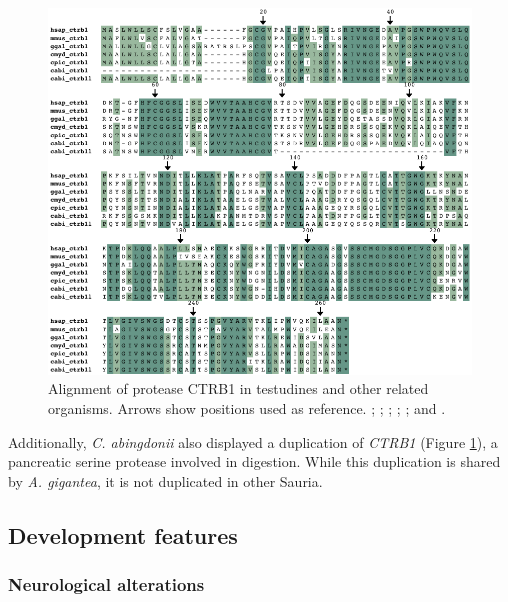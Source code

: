 \begin{figure}[b!]
    \begin{center}
        \includegraphics[width=\textwidth]{figures/alignment_ctrb1.pdf}
        \caption[Alignment of protease CTRB1 in testudines]{\footnotesize Alignment of protease CTRB1 in testudines and other related organisms. Arrows show positions used as reference. \hsap; \mmus; \ggal; \cmyd; \cpic; and \cabi.}
        \label{f_results_george_degradome_alignment_ctrb1}
    \end{center}
\end{figure}

Additionally, \textit{C. abingdonii} also displayed a duplication of \textit{CTRB1} (Figure \ref{f_results_george_degradome_alignment_ctrb1}), a pancreatic serine protease involved in digestion.
While this duplication is shared by \textit{A. gigantea}, it is not duplicated in other Sauria.

\subsection{Development features} \label{ss_results_george_degradome_development}

\subsubsection{Neurological alterations}


